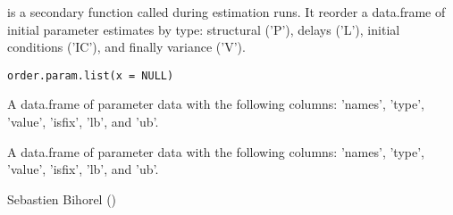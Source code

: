 %
\begin{Description}\relax
{} is a secondary function called during estimation runs.
It reorder a data.frame of initial parameter estimates by type: structural
('P'), delays ('L'), initial conditions ('IC'), and finally variance ('V').
\end{Description}
%
\begin{Usage}
\begin{verbatim}
order.param.list(x = NULL)
\end{verbatim}
\end{Usage}
%
\begin{Arguments}
\begin{ldescription}
\item[\code{x}] A data.frame of parameter data with the following columns: 'names', 
'type', 'value', 'isfix', 'lb', and 'ub'.
\end{ldescription}
\end{Arguments}
%
\begin{Value}
A data.frame of parameter data with the following columns: 'names', 'type', 'value',
'isfix', 'lb', and 'ub'.
\end{Value}
%
\begin{Author}\relax
Sebastien Bihorel ()
\end{Author}
